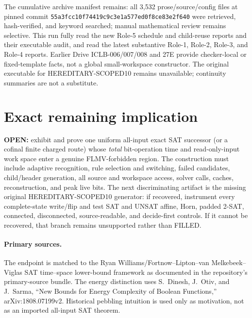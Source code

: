 \documentclass[11pt]{article}
\begin{document}
The cumulative archive manifest remains: all 3,532 prose/source/config files at pinned commit \texttt{55a3fcc10f74419c9c3e1a577ed0f8ce83e2f640} were retrieved, hash-verified, and keyword searched; manual mathematical review remains selective.  This run fully read the new Role-5 schedule and child-reuse reports and their executable audit, and read the latest substantive Role-1, Role-2, Role-3, and Role-4 reports.  Earlier Drive ICLB-006/007/008 and 27E provide checker-local or fixed-template facts, not a global small-workspace constructor.  The original executable for HEREDITARY-SCOPED10 remains unavailable; continuity summaries are not a substitute.

\section{Exact remaining implication}

\textbf{OPEN:} exhibit and prove one uniform all-input exact SAT successor (or a cofinal finite charged route) whose \emph{total} bit-operation time and read-only-input work space enter a genuine FLMV-forbidden region.  The construction must include adaptive recognition, rule selection and switching, failed candidates, child/header generation, all source and workspace access, solver calls, caches, reconstruction, and peak live bits.  The next discriminating artifact is the missing original HEREDITARY-SCOPED10 generator: if recovered, instrument every complete-state write/flip and test SAT and UNSAT affine, Horn, padded 2-SAT, connected, disconnected, source-readable, and decide-first controls.  If it cannot be recovered, that branch remains unsupported rather than FILLED.

\paragraph{Primary sources.}
The endpoint is matched to the Ryan Williams/Fortnow--Lipton--van Melkebeek--Viglas SAT time--space lower-bound framework as documented in the repository's primary-source bundle.  The energy distinction uses S.~Dinesh, J.~Otiv, and J.~Sarma, ``New Bounds for Energy Complexity of Boolean Functions,'' arXiv:1808.07199v2.  Historical pebbling intuition is used only as motivation, not as an imported all-input SAT theorem.
\end{document}
